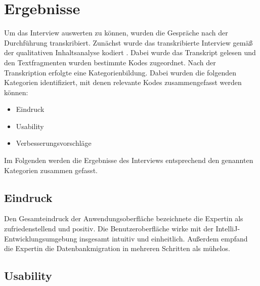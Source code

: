 %
%
%
%
%
%

\section{Ergebnisse}
Um das Interview auswerten zu können, wurden die Gespräche nach der Durchführung transkribiert. Zunächst wurde das transkribierte Interview  gemäß der qualitativen Inhaltsanalyse kodiert \cite{mayring1994qualitative}. Dabei wurde das Transkript gelesen und den Textfragmenten wurden bestimmte Kodes zugeordnet. Nach der Transkription erfolgte eine Kategorienbildung. Dabei wurden die folgenden Kategorien identifiziert, mit denen relevante Kodes zusammengefasst werden können:
\begin{itemize}
	\item Eindruck
	\item Usability
	\item Verbesserungsvorschläge
\end{itemize}

Im Folgenden werden die Ergebnisse des Interviews entsprechend den genannten Kategorien zusammen gefasst.

\subsection*{\textbf{Eindruck}}
Den Gesamteindruck der Anwendungsoberfläche bezeichnete die Expertin als zufriedenstellend und positiv. Die Benutzeroberfläche wirke mit der IntelliJ-Entwicklungsumgebung insgesamt intuitiv und einheitlich. Außerdem empfand die Expertin die Datenbankmigration in mehreren Schritten als mühelos.
 
\subsection*{\textbf{Usability}}

